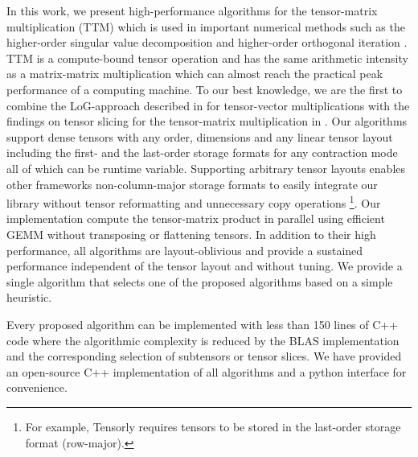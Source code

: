 In this work, we present high-performance algorithms for the tensor-matrix multiplication (TTM) which is used in important numerical methods such as the higher-order singular value decomposition and higher-order orthogonal iteration \citep{lathauwer:2000:hosvd, kolda:2009:decompositions, lee:2018:fundamental} .
TTM is a compute-bound tensor operation and has the same arithmetic intensity as a matrix-matrix multiplication which can almost reach the practical peak performance of a computing machine.
To our best knowledge, we are the first to combine the LoG-approach described in \citep{bassoy:2019:ttv, pawlowski:2019:morton.tensor.computations} for tensor-vector multiplications with the findings on tensor slicing for the tensor-matrix multiplication in \citep{li:2015:input}.
Our algorithms support dense tensors with any order, dimensions and any linear tensor layout including the first- and the last-order storage formats for any contraction mode all of which can be runtime variable.
Supporting arbitrary tensor layouts enables other frameworks non-column-major storage formats to easily integrate our library without tensor reformatting and unnecessary copy operations%
\footnote{For example, Tensorly \citep{kossaifi:2019:tensorly} requires tensors to be stored in the last-order storage format (row-major).}.
Our implementation compute the tensor-matrix product in parallel using efficient GEMM without transposing or flattening tensors.
In addition to their high performance, all algorithms are layout-oblivious and provide a sustained performance independent of the tensor layout and without tuning.
We provide a single algorithm that selects one of the proposed algorithms based on a simple heuristic.

Every proposed algorithm can be implemented with less than 150 lines of C++ code where the algorithmic complexity is reduced by the BLAS implementation and the corresponding selection of subtensors or tensor slices.
We have provided an open-source C++ implementation of all algorithms and a python interface for convenience.

